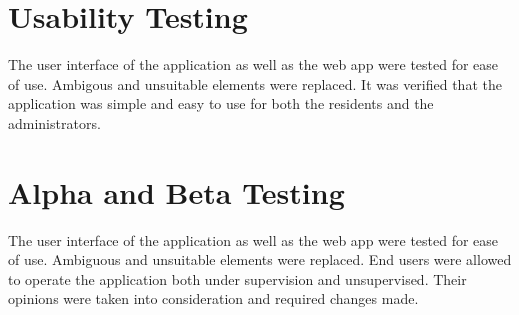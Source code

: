 \section{Usability Testing}
The user interface of the application as well as the web app were tested for ease of use. Ambigous and unsuitable elements were replaced. It was verified that the application was simple and easy to use for both the residents and the administrators.

\section{Alpha and Beta Testing}
The user interface of the application as well as the web app were tested for ease of use. Ambiguous and unsuitable elements were replaced. End users were allowed to operate the application both under supervision and unsupervised. Their opinions were taken into consideration and required changes made. 
